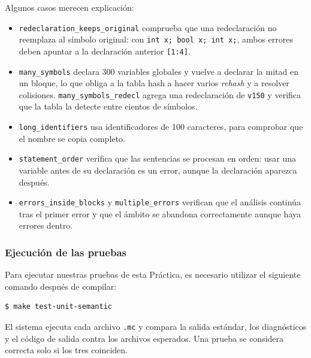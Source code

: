 \documentclass[12pt,letterpaper]{article}
\begin{document}
Algunos casos merecen explicación:

\begin{itemize}
\item \texttt{redeclaration\_keeps\_original} comprueba que una redeclaración no reemplaza al símbolo
  original: con \texttt{int x; bool x; int x;}, ambos errores deben apuntar a la declaración anterior
  \texttt{[1:4]}.

\item \texttt{many\_symbols} declara 300 variables globales y vuelve a declarar la mitad en un bloque, lo que
  obliga a la tabla hash a hacer varios \emph{rehash} y a resolver colisiones. \texttt{many\_symbols\_redecl}
  agrega una redeclaración de \texttt{v150} y verifica que la tabla la detecte entre cientos de símbolos.

\item \texttt{long\_identifiers} usa identificadores de 100 caracteres, para comprobar que el nombre se copia
  completo.

\item \texttt{statement\_order} verifica que las sentencias se procesan en orden: usar una variable antes de
  su declaración es un error, aunque la declaración aparezca después.

\item \texttt{errors\_inside\_blocks} y \texttt{multiple\_errors} verifican que el análisis continúa tras el
  primer error y que el ámbito se abandona correctamente aunque haya errores dentro.
\end{itemize}

\subsubsection*{Ejecución de las pruebas}

Para ejecutar nuestras pruebas de esta Práctica, es necesario utilizar el siguiente comando después de compilar:
\begin{verbatim}
$ make test-unit-semantic
\end{verbatim}

El sistema ejecuta cada archivo \texttt{.mc} y compara la salida estándar, los diagnósticos y el código de
salida contra los archivos esperados. Una prueba se considera correcta solo si los tres coinciden.
\end{document}
